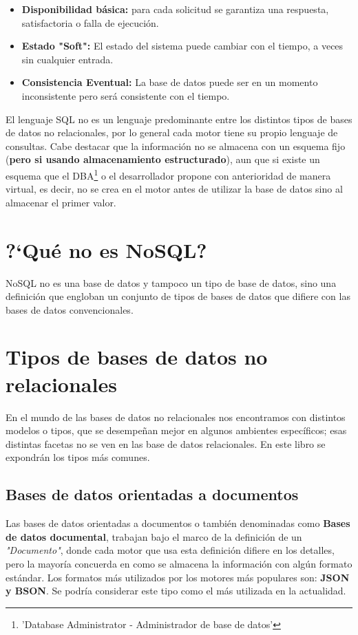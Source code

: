 \begin{itemize}
    \item \textbf{Disponibilidad b\'asica:} para cada solicitud se garantiza una respuesta, satisfactoria o falla de ejecuci\'on.
    \item \textbf{Estado "Soft":} El estado del sistema puede cambiar con el tiempo, a veces sin
cualquier entrada.
    \item \textbf{Consistencia Eventual:} La base de datos puede ser en un momento inconsistente pero
ser\'a consistente con el tiempo.
\end{itemize}

El lenguaje SQL no es un lenguaje predominante entre los distintos tipos de bases de datos no relacionales, por lo general cada motor tiene su propio lenguaje de consultas. Cabe destacar que la informaci\'on no se almacena con un esquema fijo (\textbf{pero si usando almacenamiento estructurado}), aun que si existe un esquema que el DBA\footnote{'Database Administrator - Administrador de base de datos'} o el desarrollador propone con anterioridad de manera virtual, es decir, no se crea en el motor antes de utilizar la base de datos sino al almacenar el primer valor.

\section{?`Qu\'e no es NoSQL?}

NoSQL no es una base de datos y tampoco un tipo de base de datos, sino una definici\'on que engloban un conjunto de tipos de bases de datos que difiere con las bases de datos convencionales. 

\section{Tipos de bases de datos no relacionales}

En el mundo de las bases de datos no relacionales nos encontramos con distintos modelos o tipos, que se desempe\~nan mejor en algunos ambientes espec\'ificos; esas distintas facetas no se ven en las base de datos relacionales. En este libro se expondr\'an los tipos m\'as comunes.

\subsection{Bases de datos orientadas a documentos}

Las bases de datos orientadas a documentos o tambi\'en denominadas como {\bf Bases de datos documental}, trabajan bajo el marco de la definici\'on de un \textit{"Documento"}, donde cada motor que usa esta definici\'on difiere en los detalles, pero la mayor\'ia concuerda en como se almacena la informaci\'on con alg\'un formato est\'andar. Los formatos m\'as utilizados por los motores m\'as populares son: {\bf JSON y BSON}. Se podr\'ia  considerar este tipo como el m\'as utilizada en la actualidad.

